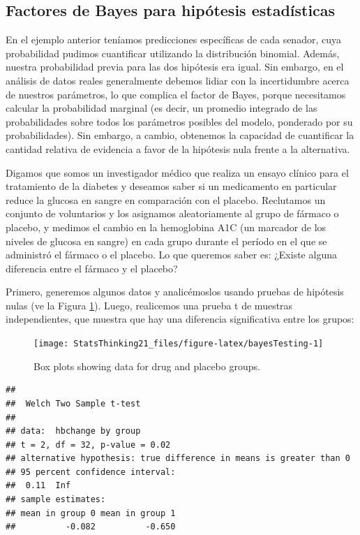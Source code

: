 \documentclass[
  12pt,
]{book}
\begin{document}
\hypertarget{factores-de-bayes-para-hipuxf3tesis-estaduxedsticas}{%
\subsection{Factores de Bayes para hipótesis estadísticas}\label{factores-de-bayes-para-hipuxf3tesis-estaduxedsticas}}

En el ejemplo anterior teníamos predicciones específicas de cada senador, cuya probabilidad pudimos cuantificar utilizando la distribución binomial. Además, nuestra probabilidad previa para las dos hipótesis era igual. Sin embargo, en el análisis de datos reales generalmente debemos lidiar con la incertidumbre acerca de nuestros parámetros, lo que complica el factor de Bayes, porque necesitamos calcular la probabilidad marginal (es decir, un promedio integrado de las probabilidades sobre todos los parámetros posibles del modelo, ponderado por su probabilidades). Sin embargo, a cambio, obtenemos la capacidad de cuantificar la cantidad relativa de evidencia a favor de la hipótesis nula frente a la alternativa.

Digamos que somos un investigador médico que realiza un ensayo clínico para el tratamiento de la diabetes y deseamos saber si un medicamento en particular reduce la glucosa en sangre en comparación con el placebo. Reclutamos un conjunto de voluntarios y los asignamos aleatoriamente al grupo de fármaco o placebo, y medimos el cambio en la hemoglobina A1C (un marcador de los niveles de glucosa en sangre) en cada grupo durante el período en el que se administró el fármaco o el placebo. Lo que queremos saber es: ¿Existe alguna diferencia entre el fármaco y el placebo?

Primero, generemos algunos datos y analicémoslos usando pruebas de hipótesis nulas (ve la Figura \ref{fig:bayesTesting}). Luego, realicemos una prueba t de muestras independientes, que muestra que hay una diferencia significativa entre los grupos:

\begin{figure}
\texttt{[image: StatsThinking21\_files/figure-latex/bayesTesting-1]} \caption{Box plots showing data for drug and placebo groups.}\label{fig:bayesTesting}
\end{figure}

\begin{verbatim}
## 
##  Welch Two Sample t-test
## 
## data:  hbchange by group
## t = 2, df = 32, p-value = 0.02
## alternative hypothesis: true difference in means is greater than 0
## 95 percent confidence interval:
##  0.11  Inf
## sample estimates:
## mean in group 0 mean in group 1 
##          -0.082          -0.650
\end{verbatim}
\end{document}
